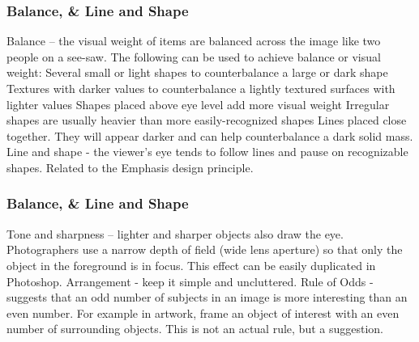\documentclass{beamer}
\begin{document}
\begin{frame}
	\frametitle{Balance, \& Line and Shape}
	\begin{outline}
		\1 Balance – 
		\2 the visual weight of items are balanced across the image like two people on a see-saw. The following can be used to achieve balance or visual weight:
		\3 Several small or light shapes to counterbalance a large or dark shape
		\3 Textures with darker values to counterbalance a lightly textured surfaces with lighter values
		\3 Shapes placed above eye level add more visual weight
		\3 Irregular shapes are usually heavier than more easily-recognized shapes
		\3 Lines placed close together. They will appear darker and can help counterbalance a dark solid mass.
		\1 Line and shape - 
		\2 the viewer’s eye tends to follow lines and pause on recognizable shapes. Related to the Emphasis design principle.
	\end{outline}
\end{frame}

\begin{frame}
	\frametitle{Balance, \& Line and Shape}
	\begin{outline}
		\1 Tone and sharpness – 
		\2 lighter and sharper objects also draw the eye. Photographers use a narrow depth of field (wide lens aperture) so that only the object in the foreground is in focus. This effect can be easily duplicated in Photoshop.
		\1 Arrangement - 
		\2 keep it simple and uncluttered.
		\1 Rule of Odds - 
		\2 suggests that an odd number of subjects in an image is more interesting than an even number. For example in artwork, frame an object of interest with an even number of surrounding objects.
		\3 This is not an actual rule, but a suggestion.
	\end{outline}
\end{frame}
	
	
\end{document}
